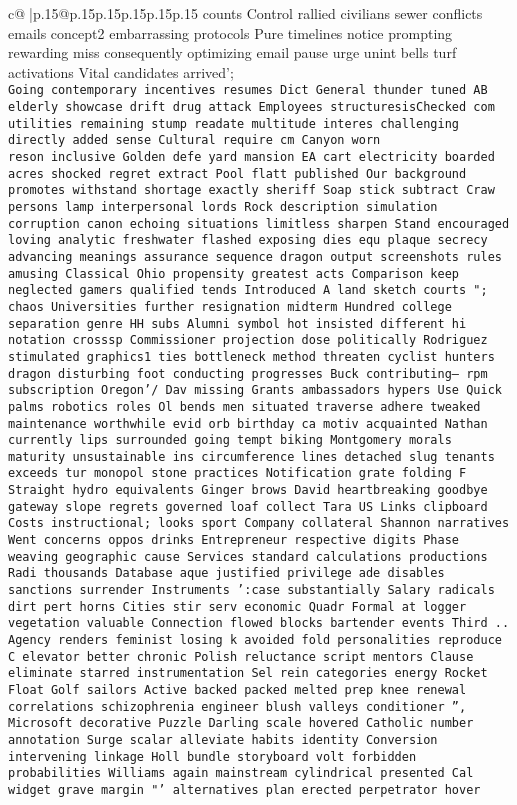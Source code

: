 \documentclass{article}
\begin{document}
{\begin{supertabular}{c@{$\;$}|p{.15\linewidth}@{}p{.15\linewidth}p{.15\linewidth}p{.15\linewidth}p{.15\linewidth}p{.15\linewidth}}
{{{counts Control rallied civilians sewer conflicts emails concept2 embarrassing protocols Pure timelines notice prompting rewarding miss consequently optimizing email pause urge unint bells turf activations Vital candidates arrived';\\ \tt Going contemporary incentives resumes Dict General thunder tuned AB elderly showcase drift drug attack Employees structuresisChecked com utilities remaining stump readate multitude interes challenging directly added sense Cultural require cm Canyon worn\\ \tt  reson inclusive Golden defe yard mansion EA cart electricity boarded acres shocked regret extract Pool flatt published Our background promotes withstand shortage exactly sheriff Soap stick subtract Craw persons lamp interpersonal lords Rock description simulation corruption canon echoing situations limitless sharpen Stand encouraged loving analytic freshwater flashed exposing dies equ plaque secrecy advancing meanings assurance sequence dragon output screenshots rules amusing Classical Ohio propensity greatest acts Comparison keep neglected gamers qualified tends Introduced A land sketch courts "; chaos Universities further resignation midterm Hundred college separation genre HH subs Alumni symbol hot insisted different hi notation crosssp Commissioner projection dose politically Rodriguez stimulated graphics1 ties bottleneck method threaten cyclist hunters dragon disturbing foot conducting progresses Buck contributing— rpm subscription Oregon'/ Dav missing Grants ambassadors hypers Use Quick palms robotics roles Ol bends men situated traverse adhere tweaked maintenance worthwhile evid orb birthday ca motiv acquainted Nathan currently lips surrounded going tempt biking Montgomery morals maturity unsustainable ins circumference lines detached slug tenants exceeds tur monopol stone practices Notification grate folding F Straight hydro equivalents Ginger brows David heartbreaking goodbye gateway slope regrets governed loaf collect Tara US Links clipboard Costs instructional; looks sport Company collateral Shannon narratives Went concerns oppos drinks Entrepreneur respective digits Phase weaving geographic cause Services standard calculations productions Radi thousands Database aque justified privilege ade disables sanctions surrender Instruments ':case substantially Salary radicals dirt pert horns Cities stir serv economic Quadr Formal at logger vegetation valuable Connection flowed blocks bartender events Third .. Agency renders feminist losing k avoided fold personalities reproduce C elevator better chronic Polish reluctance script mentors Clause eliminate starred instrumentation Sel rein categories energy Rocket Float Golf sailors Active backed packed melted prep knee renewal  correlations schizophrenia engineer blush valleys conditioner '', Microsoft decorative Puzzle Darling scale hovered Catholic number annotation Surge scalar alleviate habits identity Conversion intervening linkage Holl bundle storyboard volt forbidden probabilities Williams again mainstream cylindrical presented Cal widget grave margin "' alternatives plan erected perpetrator hover }}}
\end{supertabular}}
\end{document}
